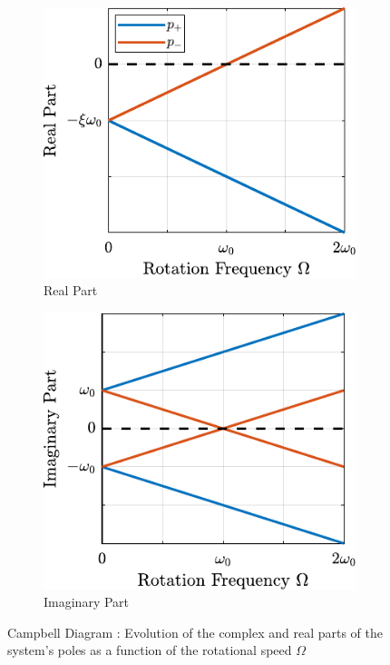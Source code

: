 \documentclass[Afour,sagev,times]{sagej}
\begin{document}
\begin{figure}[htbp]
\begin{subfigure}[c]{0.49\linewidth}
\includegraphics[width=\linewidth]{figs/campbell_diagram_real.pdf}
\caption{\label{fig:campbell_diagram_real} Real Part}
\end{subfigure}
\hfill
\begin{subfigure}[c]{0.49\linewidth}
\includegraphics[width=\linewidth]{figs/campbell_diagram_imag.pdf}
\caption{\label{fig:campbell_diagram_imag} Imaginary Part}
\end{subfigure}
\hfill
\caption{\label{fig:campbell_diagram}Campbell Diagram : Evolution of the complex and real parts of the system's poles as a function of the rotational speed \(\Omega\)}
\centering
\end{figure}
\end{document}
